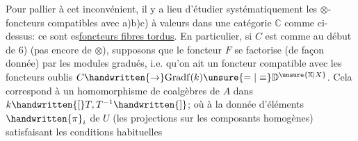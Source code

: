 Pour pallier à cet inconvénient, il y a lieu d'étudier systématiquement les $\otimes$-foncteurs compatibles avec a)b)c) à valeurs dans une catégorie $\mathbb{C}$ comme ci-dessus: ce sont es\uline{foncteurs fibres tordus}. En particulier, si $C$ est comme au début de 6) (pas encore de $\otimes$), supposons que le foncteur $F$ se factorise (de façon donnée) par les modules gradués, i.e. qu'on ait un foncteur compatible avec les foncteurs oublis $C\handwritten{\to}\mathrm{Gradf}(k)\unsure{=|\equiv}\mathbb{D}^{\unsure{\mathbb{X}|X}}$. Cela correspond à un homomorphisme de coalgèbres de $A$ dans $k\handwritten{[}T,T^{-1}\handwritten{]}$; où à la donnée d'éléments $\handwritten{\pi}_i$ de $U$ (les projections sur les composants homogènes) satisfaisant les conditions  habituelles
